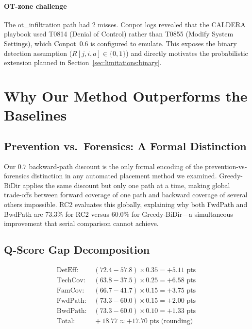 \documentclass[journal]{IEEEtran}
\begin{document}
\paragraph{OT-zone challenge}
The ot\_infiltration path had 2 misses. Conpot logs revealed that
the CALDERA playbook used T0814 (Denial of Control) rather than T0855
(Modify System Settings), which Conpot~0.6 is configured to emulate.
This exposes the binary detection assumption ($R[j,i,a]\in\{0,1\}$)
and directly motivates the probabilistic extension planned in
Section~\ref{sec:limitations:binary}.

\section{Why Our Method Outperforms the Baselines}
\label{sec:why}

\subsection{Prevention vs.\ Forensics: A Formal Distinction}
Our $0.7$ backward-path discount is the only formal encoding of the
prevention-vs-forensics distinction in any automated placement method
we examined. Greedy-BiDir applies the same discount but only one path
at a time, making global trade-offs between forward coverage of one
path and backward coverage of several others impossible. RC2 evaluates
this globally, explaining why both FwdPath and BwdPath are 73.3\% for
RC2 versus 60.0\% for Greedy-BiDir---a simultaneous improvement that
serial comparison cannot achieve.

\subsection{Q-Score Gap Decomposition}
\begin{align*}
\text{DetEff:}  &\;(72.4-57.8)\times0.35 = +5.11\text{ pts}\\
\text{TechCov:} &\;(63.8-37.5)\times0.25 = +6.58\text{ pts}\\
\text{FamCov:}  &\;(66.7-41.7)\times0.15 = +3.75\text{ pts}\\
\text{FwdPath:} &\;(73.3-60.0)\times0.15 = +2.00\text{ pts}\\
\text{BwdPath:} &\;(73.3-60.0)\times0.10 = +1.33\text{ pts}\\
\text{Total:}   &\;+18.77\approx+17.70\text{ pts (rounding)}
\end{align*}
\end{document}

